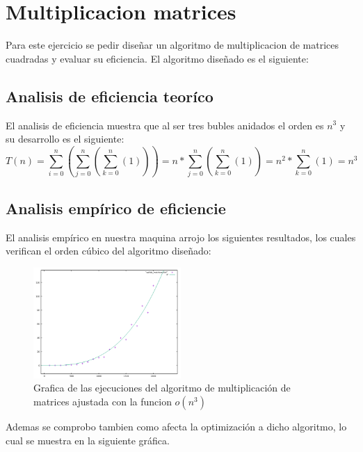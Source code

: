 \section{Multiplicacion matrices}

Para este ejercicio se pedir diseñar un algoritmo de multiplicacion de matrices cuadradas y evaluar su eficiencia. El algoritmo diseñado es el siguiente:


\subsection{Analisis de eficiencia teoríco}

El analisis de eficiencia muestra que al ser tres bubles anidados el orden es $n^{3}$ y su desarrollo es el siguiente:
\begin{equation}
T(n)=\sum_{i=0}^{n}(\sum_{j=0}^{n}(\sum_{k=0}^{n}(1)))=n*\sum_{j=0}^{n}(\sum_{k=0}^{n}(1))=n^{2}*\sum_{k=0}^{n}(1)=n^{3}
\end{equation}

\subsection{Analisis empírico de eficiencie}

El analisis empírico en nuestra maquina arrojo los siguientes resultados, los cuales verifican el orden cúbico del algoritmo diseñado:

\begin{figure}[H]
  \centering
  \includegraphics[width=0.5\textwidth]{./Imagenes/mult_matrices_ajustada.png}
  \caption{Grafica de las ejecuciones del algoritmo de multiplicación de matrices ajustada con la funcion $o(n^{3})$}
\end{figure}


Ademas se comprobo tambien como afecta la optimización a dicho algoritmo, lo cual se muestra en la siguiente gráfica.

